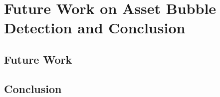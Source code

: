 \chapter{Future Work on Asset Bubble Detection and Conclusion}
\section{Future Work}
\section{Conclusion}
